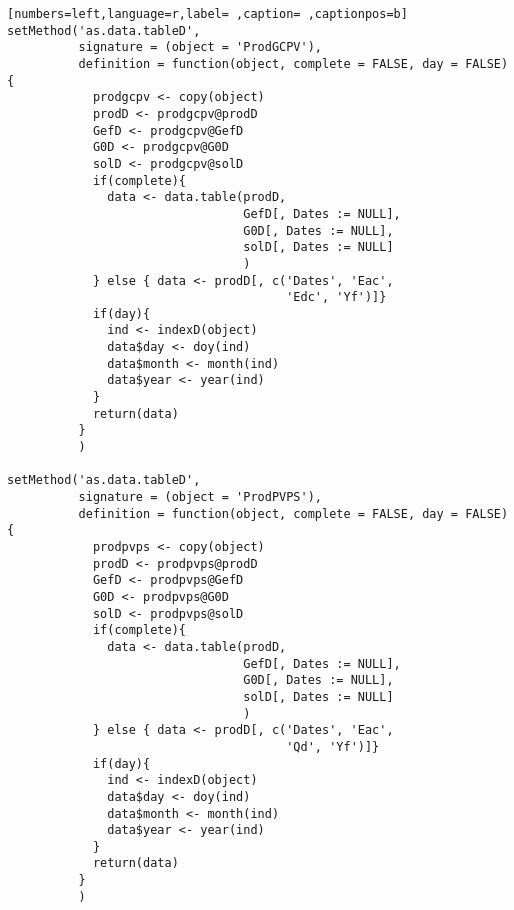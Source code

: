 \begin{lstlisting}[numbers=left,language=r,label= ,caption= ,captionpos=b]
setMethod('as.data.tableD',
          signature = (object = 'ProdGCPV'),
          definition = function(object, complete = FALSE, day = FALSE){
            prodgcpv <- copy(object)
            prodD <- prodgcpv@prodD
            GefD <- prodgcpv@GefD
            G0D <- prodgcpv@G0D
            solD <- prodgcpv@solD
            if(complete){
              data <- data.table(prodD,
                                 GefD[, Dates := NULL],
                                 G0D[, Dates := NULL],
                                 solD[, Dates := NULL]
                                 )
            } else { data <- prodD[, c('Dates', 'Eac',
                                       'Edc', 'Yf')]}
            if(day){
              ind <- indexD(object)
              data$day <- doy(ind)
              data$month <- month(ind)
              data$year <- year(ind)
            }
            return(data)
          }
          )

setMethod('as.data.tableD',
          signature = (object = 'ProdPVPS'),
          definition = function(object, complete = FALSE, day = FALSE){
            prodpvps <- copy(object)
            prodD <- prodpvps@prodD
            GefD <- prodpvps@GefD
            G0D <- prodpvps@G0D
            solD <- prodpvps@solD
            if(complete){
              data <- data.table(prodD,
                                 GefD[, Dates := NULL],
                                 G0D[, Dates := NULL],
                                 solD[, Dates := NULL]
                                 )
            } else { data <- prodD[, c('Dates', 'Eac',
                                       'Qd', 'Yf')]}
            if(day){
              ind <- indexD(object)
              data$day <- doy(ind)
              data$month <- month(ind)
              data$year <- year(ind)
            }
            return(data)
          }
          )
\end{lstlisting}

